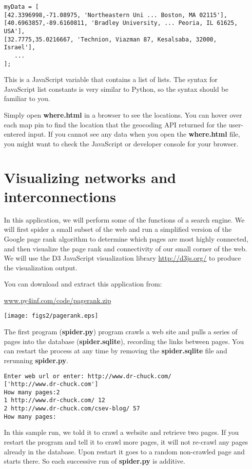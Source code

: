 \beforeverb
\begin{verbatim}
myData = [
[42.3396998,-71.08975, 'Northeastern Uni ... Boston, MA 02115'],
[40.6963857,-89.6160811, 'Bradley University, ... Peoria, IL 61625, USA'],
[32.7775,35.0216667, 'Technion, Viazman 87, Kesalsaba, 32000, Israel'],
   ...
];
\end{verbatim}
\afterverb
%
This is a JavaScript variable that contains a list of lists.  
The syntax for JavaScript list constants is very similar to 
Python, so the syntax should be familiar to you.

Simply open {\bf where.html} in a browser to see the locations.  You 
can hover over each map pin to find the location that the 
geocoding API returned for the user-entered input.  If you 
cannot see any data when you open the {\bf where.html} file, you might 
want to check the JavaScript or developer console for your browser.

\section{Visualizing networks and interconnections}

In this application, we will perform some of the functions of a search
engine.   We will first spider a small subset of the web and run
a simplified version of the Google page rank algorithm to
determine which pages are most highly connected, and then visualize
the page rank and connectivity of our small corner of the web.
We will use the D3 JavaScript visualization library 
\url{http://d3js.org/} to produce the visualization output.

You can download and extract this application from:

\url{www.py4inf.com/code/pagerank.zip}

\beforefig
\centerline{\texttt{[image: figs2/pagerank.eps]}}
\afterfig

The first program ({\bf spider.py}) program crawls a web 
site and pulls a series of pages into the
database ({\bf spider.sqlite}), recording the links between pages.
You can restart the process at any time by removing the 
{\bf spider.sqlite} file and rerunning {\bf spider.py}.

\beforeverb
\begin{verbatim}
Enter web url or enter: http://www.dr-chuck.com/
['http://www.dr-chuck.com']
How many pages:2
1 http://www.dr-chuck.com/ 12
2 http://www.dr-chuck.com/csev-blog/ 57
How many pages:
\end{verbatim}
\afterverb
%
In this sample run, we told it to crawl a website and retrieve two 
pages.  If you restart the program and tell it to crawl more
pages, it will not re-crawl any pages already in the database.  Upon 
restart it goes to a random non-crawled page and starts there.  So 
each successive run of {\bf spider.py} is additive.

